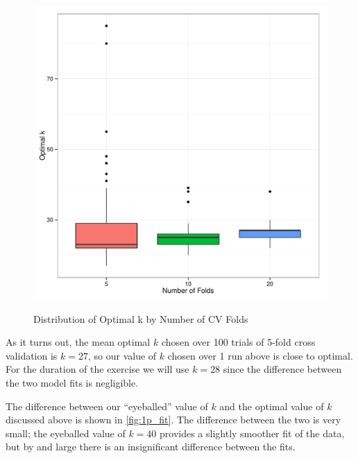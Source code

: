 \documentclass[11pt, fleqn]{article}
\begin{document}
\begin{figure}[!htb]
  \centering
  \caption{Distribution of Optimal k by Number of CV Folds}
  \includegraphics[scale=.5]{nfolds_k_dist.pdf}
  \label{fig:nfolds_k_dist}
\end{figure}

As it turns out, the mean optimal $k$ chosen over 100 trials of 5-fold cross validation is $k=27$, so our value of $k$ chosen over 1 run above is close to optimal. For the duration of the exercise we will use $k=28$ since the difference between the two model fits is negligible.

The difference between our ``eyeballed'' value of $k$ and the optimal value of $k$ discussed above is shown in \cref{fig:1p_fit}. The difference between the two is very small; the eyeballed value of $k=40$ provides a slightly smoother fit of the data, but by and large there is an insignificant difference between the fits.
\end{document}
